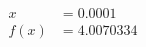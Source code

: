 \documentclass[preview]{standalone}
\begin{document}
\begin{align*}
x &= 0.0001\\f(x) &= 4.0070334
\end{align*}
\end{document}
